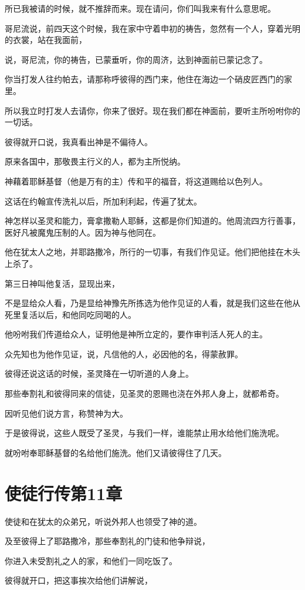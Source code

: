 \documentclass[12pt,oneside]{book}
\begin{document}
所已我被请的时候，就不推辞而来。现在请问，你们叫我来有什么意思呢。

哥尼流说，前四天这个时候，我在家中守着申初的祷告，忽然有一个人，穿着光明的衣裳，站在我面前，

说，哥尼流，你的祷告，已蒙垂听，你的周济，达到神面前已蒙记念了。

你当打发人往约帕去，请那称呼彼得的西门来，他住在海边一个硝皮匠西门的家里。

所以我立时打发人去请你，你来了很好。现在我们都在神面前，要听主所吩咐你的一切话。

彼得就开口说，我真看出神是不偏待人。

原来各国中，那敬畏主行义的人，都为主所悦纳。

神藉着耶稣基督（他是万有的主）传和平的福音，将这道赐给以色列人。

这话在约翰宣传洗礼以后，所加利利起，传遍了犹太。

神怎样以圣灵和能力，膏拿撒勒人耶稣，这都是你们知道的。他周流四方行善事，医好凡被魔鬼压制的人。因为神与他同在。

他在犹太人之地，并耶路撒冷，所行的一切事，有我们作见证。他们把他挂在木头上杀了。

第三日神叫他复活，显现出来，

不是显给众人看，乃是显给神豫先所拣选为他作见证的人看，就是我们这些在他从死里复活以后，和他同吃同喝的人。

他吩咐我们传道给众人，证明他是神所立定的，要作审判活人死人的主。

众先知也为他作见证，说，凡信他的人，必因他的名，得蒙赦罪。

彼得还说这话的时候，圣灵降在一切听道的人身上。

那些奉割礼和彼得同来的信徒，见圣灵的恩赐也浇在外邦人身上，就都希奇。

因听见他们说方言，称赞神为大。

于是彼得说，这些人既受了圣灵，与我们一样，谁能禁止用水给他们施洗呢。

就吩咐奉耶稣基督的名给他们施洗。他们又请彼得住了几天。

\chapter{使徒行传第11章}
使徒和在犹太的众弟兄，听说外邦人也领受了神的道。

及至彼得上了耶路撒冷，那些奉割礼的门徒和他争辩说，

你进入未受割礼之人的家，和他们一同吃饭了。

彼得就开口，把这事挨次给他们讲解说，
\end{document}
